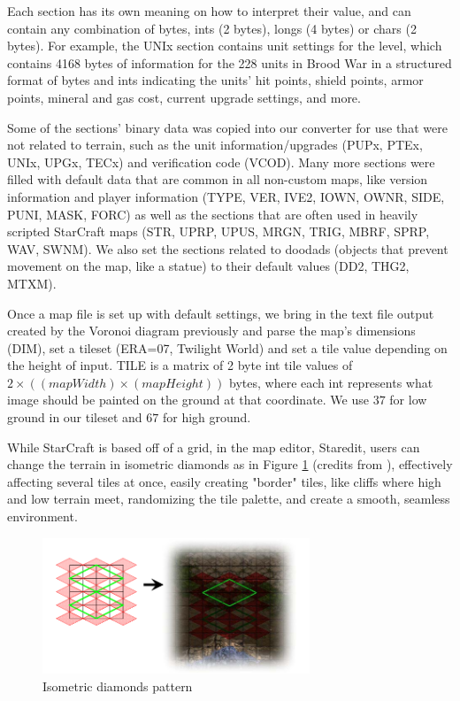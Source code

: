 \documentclass[letterpaper]{article}
\begin{document}
Each section has its own meaning on how to interpret their value, and can contain any combination of bytes, ints (2 bytes), longs (4 bytes) or chars (2 bytes). For example, the UNIx section contains unit settings for the level, which contains 4168 bytes of information for the 228 units in Brood War in a structured format of bytes and ints indicating the units' hit points, shield points, armor points, mineral and gas cost, current upgrade settings, and more.

Some of the sections' binary data was copied into our converter for use that were not related to terrain, such as the unit information/upgrades (PUPx, PTEx, UNIx, UPGx, TECx) and verification code (VCOD). Many more sections were filled with default data that are common in all non-custom maps, like version information and player information (TYPE, VER, IVE2, IOWN, OWNR, SIDE, PUNI, MASK, FORC) as well as the sections that are often used in heavily scripted StarCraft maps (STR, UPRP, UPUS, MRGN, TRIG, MBRF, SPRP, WAV, SWNM). We also set the sections related to doodads (objects that prevent movement on the map, like a statue) to their default values (DD2, THG2, MTXM).

Once a map file is set up with default settings, we bring in the text file output created by the Voronoi diagram previously and parse the map's dimensions (DIM), set a tileset (ERA=07, Twilight World) and set a tile value depending on the height of input. TILE is a matrix of 2 byte int tile values of $2 \times ((mapWidth)  \times (mapHeight))$ bytes, where each int represents what image should be painted on the ground at that coordinate. We use $37$ for low ground in our tileset and $67$ for high ground.

While StarCraft is based off of a grid, in the map editor, Staredit, users can change the terrain in isometric diamonds as in Figure \ref{fig:iso-diamonds} (credits from \cite{Zepir}), effectively affecting several tiles at once, easily creating "border" tiles, like cliffs where high and low terrain meet, randomizing the tile palette, and create a smooth, seamless environment.

\begin{figure}[ht]
    \centering
    \includegraphics[width=8cm]{iso-diamonds.png}
    \caption{Isometric diamonds pattern}
    \label{fig:iso-diamonds}
\end{figure}
\end{document}
